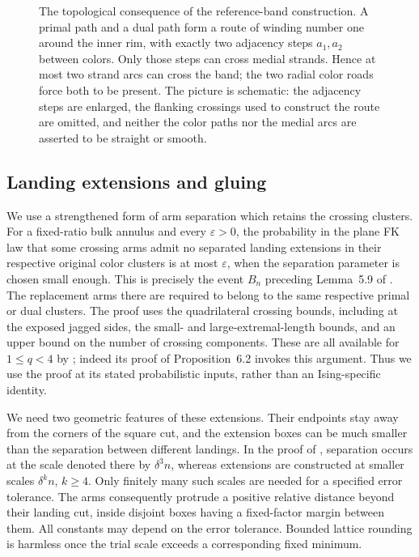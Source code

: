 \begin{figure}[tbp]
\centering

\caption{The topological consequence of the reference-band
construction.  A primal path and a dual path form a route of winding
number one around the inner rim, with exactly two adjacency steps
$a_1,a_2$ between colors.  Only those steps can cross medial strands.
Hence at most two strand arcs can cross the band; the two radial
color roads force both to be present.  The picture is schematic:
the adjacency steps are enlarged, the flanking crossings used to
construct the route are omitted, and neither the color paths nor
the medial arcs are asserted to be straight or smooth.}
\label{fig:barrier}
\end{figure}

\subsection{Landing extensions and gluing}

We use a strengthened form of arm separation which retains the
crossing clusters.  For a fixed-ratio bulk annulus and every
$\varepsilon>0$, the probability in the plane FK law that some crossing arms admit no
separated landing extensions in their respective original color
clusters is at most $\varepsilon$, when the separation parameter is
chosen small enough.  This is precisely the event $B_n$ preceding
Lemma~5.9 of \cite{CDCH}.  The replacement arms there are required to
belong to the same respective primal or dual clusters.  The proof
uses the quadrilateral crossing bounds, including at the exposed
jagged sides, the small- and large-extremal-length bounds, and an
upper bound on the number of crossing components.  These are all
available for $1\le q<4$ by \cite[Theorem~1.2 and Section~6]{DMT};
indeed its proof of Proposition~6.2 invokes this argument.  Thus we
use the proof at its stated probabilistic inputs, rather than an
Ising-specific identity.

We need two geometric features of these extensions.  Their endpoints
stay away from the corners of the square cut, and the extension
boxes can be much smaller than the separation between different
landings.  In the proof of \cite[Lemma~5.9]{CDCH}, separation occurs
at the scale denoted there by $\delta^3 n$, whereas extensions are
constructed at smaller scales $\delta^k n$, $k\ge4$.  Only finitely
many such scales are needed for a specified error tolerance.  The
arms consequently protrude a positive relative distance beyond
their landing cut, inside disjoint boxes having a fixed-factor
margin between them.  All constants may depend on the error
tolerance.  Bounded lattice rounding is harmless once the trial
scale exceeds a corresponding fixed minimum.

